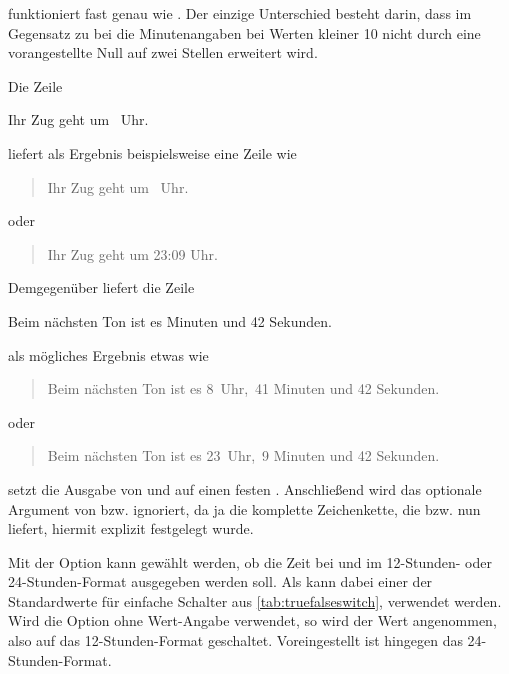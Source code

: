  funktioniert fast genau wie . Der
einzige Unterschied besteht darin, dass im Gegensatz zu
 bei  die Minutenangaben bei Werten
kleiner 10 nicht durch eine vorangestellte Null auf zwei Stellen
erweitert wird.
\begin{Example}
  Die Zeile
\begin{lstcode}
  Ihr Zug geht um \thistime\ Uhr.
\end{lstcode}
  liefert als Ergebnis beispielsweise eine Zeile wie
  \begin{quote}
    Ihr Zug geht um \thistime\ Uhr.
  \end{quote}
  oder
  \begin{quote}
    Ihr Zug geht um 23:09 Uhr.
  \end{quote}
  \bigskip
  Demgegenüber liefert die Zeile
\begin{lstcode}
  Beim nächsten Ton ist es \thistime*[\ Uhr,\ ] 
  Minuten und 42 Sekunden.
\end{lstcode}
  als mögliches Ergebnis etwas wie
  \begin{quote}
    Beim nächsten Ton ist es 8\ Uhr,\ 41 Minuten und 42 Sekunden.
  \end{quote}
  oder
  \begin{quote}
    Beim nächsten Ton ist es 23\ Uhr,\ 9 Minuten und 42 Sekunden.
  \end{quote}
\end{Example}
\EndIndexGroup


\begin{Declaration}%
\end{Declaration}%
 setzt die Ausgabe von  und
 auf einen festen %
. %
Anschließend wird das optionale Argument von  bzw.
 ignoriert, da ja die komplette Zeichenkette, die
 bzw.  nun liefert, hiermit explizit
festgelegt wurde.%
\EndIndexGroup


\begin{Declaration}
\end{Declaration}%
%
Mit der Option  kann gewählt
werden, ob die Zeit bei  und  im 12-Stunden-
oder 24-Stunden-Format ausgegeben werden soll. Als  kann
dabei einer der Standardwerte für einfache Schalter aus
\autoref{tab:truefalseswitch},  verwendet
werden. Wird die Option ohne Wert-Angabe verwendet, so wird der Wert
 angenommen, also auf das 12-Stunden-Format geschaltet.
Voreingestellt ist hingegen das 24-Stunden-Format.%

